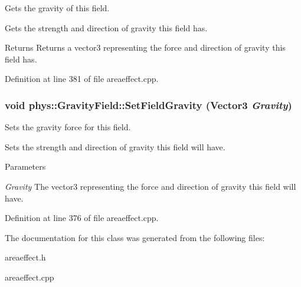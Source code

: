 Gets the gravity of this field. 

Gets the strength and direction of gravity this field has. \begin{DoxyReturn}{Returns}
Returns a vector3 representing the force and direction of gravity this field has. 
\end{DoxyReturn}


Definition at line 381 of file areaeffect.cpp.

\hypertarget{classphys_1_1GravityField_a7cebfe216580e9ef607a2ea070cbeaec}{
\subsubsection[{SetFieldGravity}]{\setlength{\rightskip}{0pt plus 5cm}void phys::GravityField::SetFieldGravity ({\bf Vector3} {\em Gravity})}}
\label{d4/d8a/classphys_1_1GravityField_a7cebfe216580e9ef607a2ea070cbeaec}


Sets the gravity force for this field. 

Sets the strength and direction of gravity this field will have. 
\begin{DoxyParams}{Parameters}
\item[{\em Gravity}]The vector3 representing the force and direction of gravity this field will have. \end{DoxyParams}


Definition at line 376 of file areaeffect.cpp.



The documentation for this class was generated from the following files:\begin{DoxyCompactItemize}
\item 
areaeffect.h\item 
areaeffect.cpp\end{DoxyCompactItemize}
